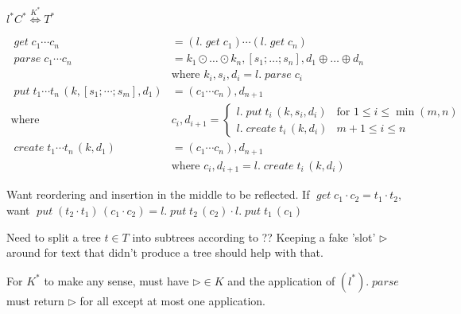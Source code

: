 \documentclass[12pt,fleqn]{amsart}
\newcommand{\ensmath}[1]{\ensuremath{#1}\xspace}
\newcommand{\opnam}[1]{\ensmath{\operatorname{\mathit{#1}}}}
\newcommand{\nparse}{\opnam{parse}}
\newcommand{\lget}[1]{\opnam{get}{#1}}
\newcommand{\lparse}[1]{\nparse{#1}}
\newcommand{\lput}[2]{\opnam{put}{#1}\,{(#2)}}
\newcommand{\lcreate}[2]{\opnam{create}{#1}\,{(#2)}}
\newcommand{\lenstype}[3][K]{\ensmath{{#2}\stackrel{#1}{\Longleftrightarrow}{#3}}}
\newcommand{\conc}[2]{\ensmath{#1\cdot #2}}
\newcommand{\cstar}[1]{\ensmath{#1^*}}
\newcommand{\uastar}[1]{\ensmath{#1^{!*}}}
\newcommand{\key}[1]{\ensmath{\kappa(#1)}}
\begin{document}
\infrule{l\in\lenstype{C}{T} \andalso \uastar{C} \andalso \uastar{\key{T}}}
        {\cstar{l}\in\lenstype[\cstar{K}]{\cstar{C}}{\cstar{T}}}

\begin{align*}
  \lget{c_1\cdots c_n} &= (l.\lget{c_1}) \cdots (l.\lget{c_n})\\
  \lparse{c_1\cdots c_n} &= k_1\odot\ldots\odot k_n, [s_1;\ldots;s_n],
                            d_1\oplus\ldots\oplus d_n\\
                            & \text{where } k_i,s_i,d_i = l.\lparse{c_i}\\
  \lput{t_1\cdots t_n}{k, [s_1;\cdots;s_m], d_1} &= (c_1 \cdots c_n), d_{n+1}\\
  \text{where } &c_i, d_{i+1} =
    \begin{cases}
      l.\lput{t_i}{k, s_i, d_i} & \text{for } 1 \leq i \leq \min(m,n)\\
      l.\lcreate{t_i}{k, d_i} & m+1 \leq i \leq n
    \end{cases}\\
  \lcreate{t_1 \cdots t_n}{k, d_1} &= (c_1\cdots c_n), d_{n+1}\\
  & \text{where } c_i, d_{i+1} = l.\lcreate{t_i}{k, d_i}
\end{align*}

Want reordering and insertion in the middle to be reflected. If
$\lget{\conc{c_1}{c_2}} = \conc{t_1}{t_2}$, want
$\lput{(\conc{t_2}{t_1})}{\conc{c_1}{c_2}} = \conc{l.\lput{t_2}{c_2}}{l.\lput{t_1}{c_1}}$

Need to split a tree $t\in T$ into subtrees according to ?? Keeping a fake
'slot' $\rhd$ around for text that didn't produce a tree should help with
that.

For $K^*$ to make any sense, must have $\rhd\in K$ and the application of
$(l^*).\nparse$ must return $\rhd$ for all except at most one application.
\end{document}
